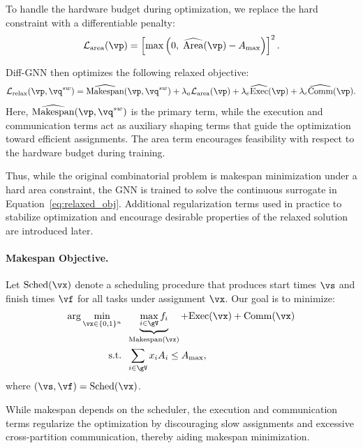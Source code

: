 To handle the hardware budget during optimization, we replace the hard constraint with a differentiable penalty:
\begin{equation}
\mathcal{L}_{\mathrm{area}}(\vp)=
\left[
\max\left(
0,\;
\widehat{\mathrm{Area}}(\vp)-A_{\max}
\right)
\right]^2.
\label{eq:l_area}
\end{equation}

Diff-GNN then optimizes the following relaxed objective:
\begin{equation}
\mathcal{L}_{\mathrm{relax}}(\vp,\vq^{sw}) =
\widehat{\mathrm{Makespan}}(\vp,\vq^{sw})
+ \lambda_a \mathcal{L}_{\mathrm{area}}(\vp)
+ \lambda_e \widehat{\mathrm{Exec}}(\vp)
+ \lambda_c \widehat{\mathrm{Comm}}(\vp).
\label{eq:relaxed_obj}
\end{equation}
Here, $\widehat{\mathrm{Makespan}}(\vp,\vq^{sw})$ is the primary term, while the execution and communication terms act as auxiliary shaping terms that guide the optimization toward efficient assignments. The area term encourages feasibility with respect to the hardware budget during training.

Thus, while the original combinatorial problem is makespan minimization under a hard area constraint, the GNN is trained to solve the continuous surrogate in Equation~\eqref{eq:relaxed_obj}. Additional regularization terms used in practice to stabilize optimization and encourage desirable properties of the relaxed solution are introduced later.


\paragraph{\textbf{Makespan Objective.}}
Let $\mathrm{Sched}(\vx)$ denote a scheduling procedure that produces start times $\vs$ and finish times $\vf$ for all tasks under assignment $\vx$. Our goal is to minimize:
\begin{align}
\label{eq:objective}
    \arg\min_{\vx \in \{0,1\}^n} \;\;
    & \underbrace{\max_{i \in \gV} f_i}_{\mathrm{Makespan}(\vx)}
    + \mathrm{Exec}(\vx)
    + \mathrm{Comm}(\vx) \\
    \textrm{s.t.} \;\;
    & \sum_{i \in \gV} x_i A_i \leq A_{\max},
\end{align}
where $(\vs, \vf) = \mathrm{Sched}(\vx)$.

While makespan depends on the scheduler, the execution and communication terms regularize the optimization by discouraging slow assignments and excessive cross-partition communication, thereby aiding makespan minimization.

